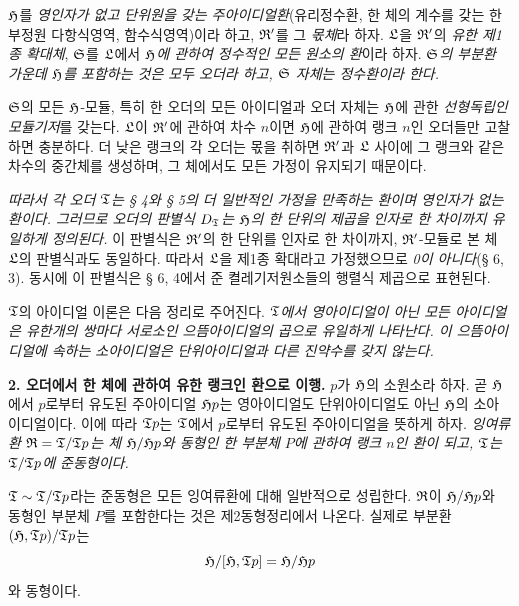 \(\mathfrak H\)를 \emph{영인자가 없고 단위원을 갖는 주아이디얼환}(유리정수환, 한 체의 계수를 갖는 한 부정원 다항식영역, 함수식영역)이라 하고, \(\mathfrak R'\)를 그 \emph{몫체}라 하자. \(\mathfrak L\)을 \(\mathfrak R'\)의 \emph{유한 제1종 확대체}, \(\mathfrak S\)를 \(\mathfrak L\)에서 \emph{\(\mathfrak H\)에 관하여 정수적인 모든 원소의 환}이라 하자. \emph{\(\mathfrak S\)의 부분환 가운데 \(\mathfrak H\)를 포함하는 것은 모두 오더라 하고, \(\mathfrak S\) 자체는 정수환이라 한다.}

\(\mathfrak S\)의 모든 \(\mathfrak H\)-모듈, 특히 한 오더의 모든 아이디얼과 오더 자체는 \(\mathfrak H\)에 관한 \emph{선형독립인 모듈기저}를 갖는다. \(\mathfrak L\)이 \(\mathfrak R'\)에 관하여 차수 \(n\)이면 \(\mathfrak H\)에 관하여 랭크 \(n\)인 오더들만 고찰하면 충분하다. 더 낮은 랭크의 각 오더는 몫을 취하면 \(\mathfrak R'\)과 \(\mathfrak L\) 사이에 그 랭크와 같은 차수의 중간체를 생성하며, 그 체에서도 모든 가정이 유지되기 때문이다.

\emph{따라서 각 오더 \(\mathfrak{T}\)는 § 4와 § 5의 더 일반적인 가정을 만족하는 환이며 영인자가 없는 환이다. 그러므로 오더의 판별식 \(D_{\mathfrak{T}}\)는 \(\mathfrak H\)의 한 단위의 제곱을 인자로 한 차이까지 유일하게 정의된다.} 이 판별식은 \(\mathfrak R'\)의 한 단위를 인자로 한 차이까지, \(\mathfrak R'\)-모듈로 본 체 \(\mathfrak L\)의 판별식과도 동일하다. 따라서 \(\mathfrak L\)을 제1종 확대라고 가정했으므로 \emph{0이 아니다}(§ 6, 3). 동시에 이 판별식은 § 6, 4에서 준 켤레기저원소들의 행렬식 제곱으로 표현된다.

\(\mathfrak{T}\)의 아이디얼 이론은 다음 정리로 주어진다. \emph{\(\mathfrak{T}\)에서 영아이디얼이 아닌 모든 아이디얼은 유한개의 쌍마다 서로소인 으뜸아이디얼의 곱으로 유일하게 나타난다. 이 으뜸아이디얼에 속하는 소아이디얼은 단위아이디얼과 다른 진약수를 갖지 않는다.}

\textbf{2. 오더에서 한 체에 관하여 유한 랭크인 환으로 이행.} \(p\)가 \(\mathfrak H\)의 소원소라 하자. 곧 \(\mathfrak H\)에서 \(p\)로부터 유도된 주아이디얼 \(\mathfrak H p\)는 영아이디얼도 단위아이디얼도 아닌 \(\mathfrak H\)의 소아이디얼이다. 이에 따라 \(\mathfrak{T} p\)는 \(\mathfrak{T}\)에서 \(p\)로부터 유도된 주아이디얼을 뜻하게 하자. \emph{잉여류환 \(\mathfrak{R}=\mathfrak{T}/\mathfrak{T} p\)는 체 \(\mathfrak H/\mathfrak H p\)와 동형인 한 부분체 \(P\)에 관하여 랭크 \(n\)인 환이 되고, \(\mathfrak{T}\)는 \(\mathfrak{T}/\mathfrak{T} p\)에 준동형이다.}

\(\mathfrak{T}\sim\mathfrak{T}/\mathfrak{T} p\)라는 준동형은 모든 잉여류환에 대해 일반적으로 성립한다. \(\mathfrak{R}\)이 \(\mathfrak H/\mathfrak H p\)와 동형인 부분체 \(P\)를 포함한다는 것은 제2동형정리에서 나온다. 실제로 부분환 \((\mathfrak H,\mathfrak{T} p)/\mathfrak{T} p\)는
\[
\mathfrak H/[\mathfrak H,\mathfrak{T} p]=\mathfrak H/\mathfrak H p
\]
와 동형이다.

